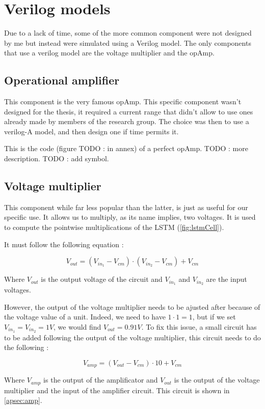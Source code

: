 \section{Verilog models}
\label{sec:models}

Due to a lack of time, some of the more common component were not designed by me but instead were simulated using a Verilog model. The only components that use a verilog model are the voltage multiplier and the \ac{opAmp}.

\subsection{Operational amplifier}

This component is the very famous \ac{opAmp}. This specific component wasn't designed for the thesis, it required a current range that didn't allow to use ones already made by members of the research group. The choice was then to use a verilog-A model, and then design one if time permits it.

This is the code (figure TODO : in annex) of a perfect \ac{opAmp}. TODO : more description.
TODO : add symbol.

\subsection{Voltage multiplier}

This component while far less popular than the latter, is just as useful for our specific use. It allows us to multiply, as its name implies, two voltages. It is used to compute the pointwise multiplications of the \ac{LSTM} (\cref{fig:lstmCell}).

It must follow the following equation :

\begin{equation}
  V_{out}=(V_{in_1}-V_{cm})\cdot (V_{in_2}-V_{cm}) + V_{cm}
\end{equation}

Where $V_{out}$ is the output voltage of the circuit and $V_{in_1}$ and $V_{in_2}$ are the input voltages.

However, the output of the voltage multiplier needs to be ajusted after because of the voltage value of a unit. Indeed, we need to have $1\cdot 1=1$, but if we set $V_{in_1}=V_{in_2}=1V$, we would find $V_{out}=0.91V$. To fix this issue, a small circuit has to be added following the output of the voltage multiplier, this circuit needs to do the following :

\begin{equation}
  V_{amp}=(V_{out}-V_{cm})\cdot10+V_{cm}
\end{equation}

Where $V_{amp}$ is the output of the amplificator and $V_{out}$ is the output of the voltage multiplier and the input of the amplifier circuit.
This circuit is shown in \cref{apsec:amp}.
